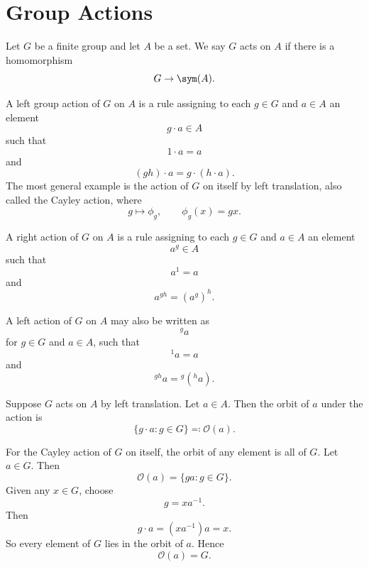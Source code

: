 
\section{Group Actions}

Let $G$ be a finite group and let $A$ be a set.
We say $G$ acts on $A$ if there is a homomorphism
\[
    G\to \sym(A).
\]
\begin{definition}
    A left group action of $G$ on $A$ is a rule assigning to each $g\in G$ and $a\in A$ an element
    \[
        g\cdot a\in A
    \]
    such that
    \[
        1\cdot a=a
    \]
    and
    \[
        (gh)\cdot a=g\cdot (h\cdot a).
    \]
    The most general example is the action of $G$ on itself by left translation, also called the Cayley action, where
    \[
        g\mapsto \phi_g,
        \qquad
        \phi_g(x)=gx.
    \]
\end{definition}

\begin{definition}
    A right action of $G$ on $A$ is a rule assigning to each $g\in G$ and $a\in A$ an element
    \[
        a^g\in A
    \]
    such that
    \[
        a^1=a
    \]
    and
    \[
        a^{gh}=(a^g)^h.
    \]
\end{definition}

\begin{definition}
    A left action of $G$ on $A$ may also be written as
    \[
            {}^{g}a
    \]
    for $g\in G$ and $a\in A$, such that
    \[
            {}^{1}a=a
    \]
    and
    \[
            {}^{gh}a = {}^g({}^{h}a).
    \]
\end{definition}

\begin{definition}[Orbit]
    Suppose $G$ acts on $A$ by left translation.
    Let $a\in A$.
    Then the orbit of $a$ under the action is
    \[
        \{g\cdot a:g\in G\}\eqqcolon \mathcal{O}(a).
    \]
\end{definition}

\begin{lemma}{
    For the Cayley action of $G$ on itself, the orbit of any element is all of $G$.
}
    Let $a\in G$.
    Then
    \[
        \mathcal{O}(a)=\{ga:g\in G\}.
    \]
    Given any $x\in G$, choose
    \[
        g=xa^{-1}.
    \]
    Then
    \[
        g\cdot a=(xa^{-1})a=x.
    \]
    So every element of $G$ lies in the orbit of $a$.
    Hence
    \[
        \mathcal{O}(a)=G.
    \]
\end{lemma}

